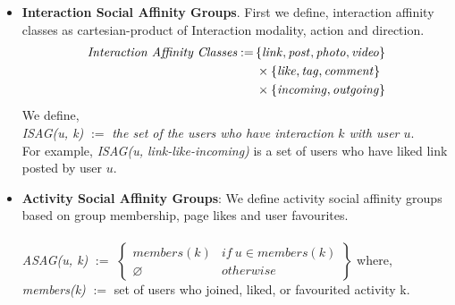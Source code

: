 \begin{itemize}
  \item \textbf{Interaction  Social Affinity Groups}. First we define, interaction affinity classes as cartesian-product of 
  Interaction modality, action and direction.
  \begin{align*}
  	\textit{Interaction Affinity Classes} := \, & \{\link, \post, \photo, \video\} \\
                                                & \times \{\like, \ttag, \comment\} \\
                                                & \times \{\incoming, \outgoing\}
  \end{align*}
  We define,\\
  \textit{ISAG(u, k)} $:=$ \textit{the set of the users who have interaction $k$ with user $u$}.\\
   For example,
   \textit{ISAG(u, link-like-incoming)}  is a set of users who have liked link posted by user $u$.
\item \textbf{Activity Social Affinity Groups}: We define activity social affinity groups based on group membership, page likes and user favourites.\\ \\
	\textit{ASAG(u, k)} $:=$
							\begin{math} 
							\begin{Bmatrix}
								members(k) & if\ u \in members(k)\\ 	
								\varnothing & otherwise
							\end{Bmatrix}
							\end{math}
	where, 	\textit{members(k)} $:=$ set of users who joined, liked, or favourited activity k.		
\end{itemize}


